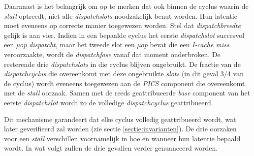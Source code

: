 \documentclass[12pt,a4paper,faculty=ea,language=nl]{ugent-doc}
\begin{document}
Daarnaast is het belangrijk om op te merken dat ook binnen de cyclus waarin de \textit{stall} optreedt, niet alle \textit{dispatchslots} noodzakelijk benut worden. Hun latentie moet eveneens op correcte manier toegewezen worden. Stel dat \textit{dispatchbreedte} gelijk is aan vier. Indien in een bepaalde cyclus het eerste \textit{dispatchslot} succesvol een \textit{µop} \textit{dispatcht}, maar het tweede slot
een \textit{µop} bevat die een \textit{I-cache miss} veroorzaakte, wordt de \textit{dispatchfase} vanaf dat moment onderbroken. De resterende drie \textit{dispatchslots} in die cyclus blijven ongebruikt.
De fractie van de \textit{dispatchcyclus} die overeenkomt met deze ongebruikte \textit{slots} (in dit geval 3/4 van de cyclus) wordt eveneens toegewezen aan de \textit{PICS} component die overeenkomt met de \textit{stall} oorzaak.
Samen met de reeds geattribueerde \textit{base} component van het eerste \textit{dispatchslot} wordt zo de volledige \textit{dispatchcyclus} geattribueerd.


Dit mechanisme garandeert dat elke cyclus volledig geattribueerd wordt, wat later geverifieerd zal worden (zie sectie \ref{sectie:invarianten}). De drie oorzaken voor een \textit{stall} verschillen voornamelijk in hoe en wanneer hun latentie bepaald wordt. In wat volgt zullen de drie gevallen verder genuanceerd worden.
\end{document}
